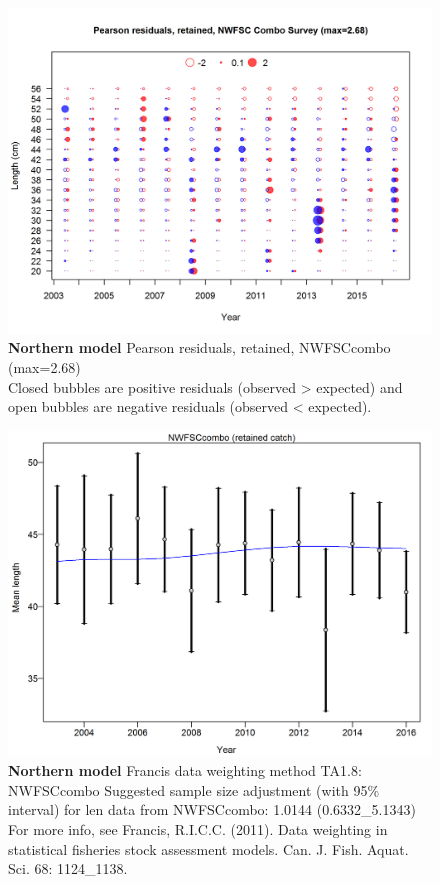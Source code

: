 \documentclass[12pt,]{article}
\begin{document}
\begin{figure}[htbp]
\centering
\includegraphics{./r4ss/plots_mod1/comp_lenfit_residsflt6mkt2.png}
\caption{\textbf{Northern model} Pearson residuals, retained, NWFSCcombo
(max=2.68)\\
Closed bubbles are positive residuals (observed \textgreater{} expected)
and open bubbles are negative residuals (observed \textless{} expected).
\label{fig:mod1_27_comp_lenfit_residsflt6mkt2}}
\end{figure}

\begin{figure}[htbp]
\centering
\includegraphics{./r4ss/plots_mod1/comp_lenfit_data_weighting_TA1.8_NWFSCcombo.png}
\caption{\textbf{Northern model} Francis data weighting method TA1.8:
NWFSCcombo Suggested sample size adjustment (with 95\% interval) for len
data from NWFSCcombo: 1.0144 (0.6332\_5.1343) For more info, see
Francis, R.I.C.C. (2011). Data weighting in statistical fisheries stock
assessment models. Can. J. Fish. Aquat. Sci. 68: 1124\_1138.
\label{fig:mod1_29_comp_lenfit_data_weighting_TA1.8_NWFSCcombo}}
\end{figure}
\end{document}

